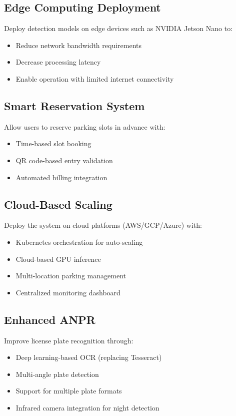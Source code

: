 \documentclass[12pt,a4paper]{report}
\begin{document}
\subsection{Edge Computing Deployment}
Deploy detection models on edge devices such as NVIDIA Jetson Nano to:
\begin{itemize}
    \item Reduce network bandwidth requirements
    \item Decrease processing latency
    \item Enable operation with limited internet connectivity
\end{itemize}

\subsection{Smart Reservation System}
Allow users to reserve parking slots in advance with:
\begin{itemize}
    \item Time-based slot booking
    \item QR code-based entry validation
    \item Automated billing integration
\end{itemize}

\subsection{Cloud-Based Scaling}
Deploy the system on cloud platforms (AWS/GCP/Azure) with:
\begin{itemize}
    \item Kubernetes orchestration for auto-scaling
    \item Cloud-based GPU inference
    \item Multi-location parking management
    \item Centralized monitoring dashboard
\end{itemize}

\subsection{Enhanced ANPR}
Improve license plate recognition through:
\begin{itemize}
    \item Deep learning-based OCR (replacing Tesseract)
    \item Multi-angle plate detection
    \item Support for multiple plate formats
    \item Infrared camera integration for night detection
\end{itemize}
\end{document}
